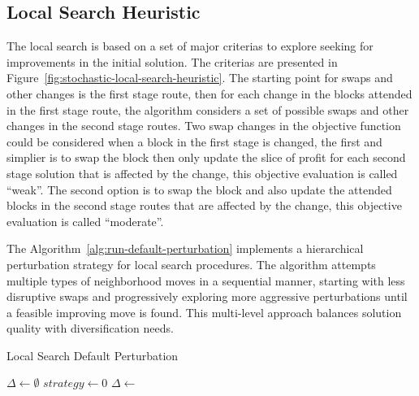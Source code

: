 \subsection{Local Search Heuristic}

The local search is based on a set of major criterias to explore seeking for improvements in the initial solution. The criterias are presented in Figure~\ref{fig:stochastic-local-search-heuristic}. The starting point for swaps and other changes is the first stage route, then for each change in the blocks attended in the first stage route, the algorithm considers a set of possible swaps and other changes in the second stage routes.
Two swap changes in the objective function could be considered when a block in the first stage is changed, the first and simplier is to swap the block then only update the slice of profit for each second stage solution that is affected by the change, this objective evaluation is called ``weak''. The second option is to swap the block and also update the attended blocks in the second stage routes that are affected by the change, this objective evaluation is called ``moderate''.

The Algorithm~\ref{alg:run-default-perturbation} implements a hierarchical perturbation strategy for local search procedures. The algorithm attempts multiple types of neighborhood moves in a sequential manner, starting with less disruptive swaps and progressively exploring more aggressive perturbations until a feasible improving move is found. This multi-level approach balances solution quality with diversification needs.

\begin{algorithm}[h!]
	\caption{Local Search Default Perturbation} \label{alg:run-default-perturbation}
	\SetAlgoLined

	$\Delta \leftarrow \emptyset$\;
	$strategy \leftarrow 0$\;
	\If{$\Delta \neq \emptyset$}{
		\Return{$\Delta$}\;
	}
	$\Delta \leftarrow$ \;
	\If{$\Delta \neq \emptyset$}{
		\Return{$\Delta$}\;
	}
	\;
\end{algorithm}

